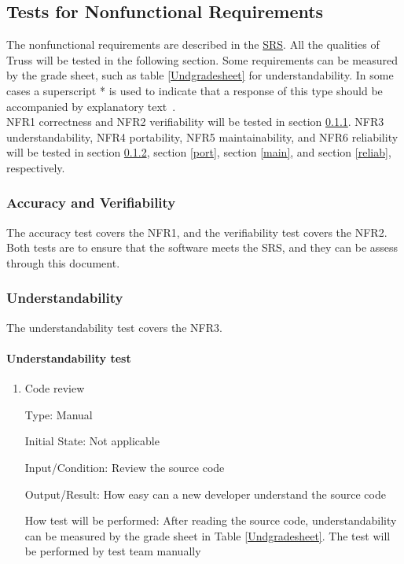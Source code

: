 \documentclass[12pt, titlepage]{article}
\begin{document}
\subsection{Tests for Nonfunctional Requirements} \label{testnfr}
The nonfunctional requirements are described in the 
\href{https://github.com/tingyuw/cas741/blob/master/docs/SRS/SRS.pdf}{SRS}. All 
the qualities of Truss will be tested in the following section. Some 
requirements can be measured by the grade sheet, such as table 
\ref{Undgradesheet} for understandability. In some cases a superscript * is 
used to indicate that a response of this type should be accompanied by 
explanatory text~\cite{Smithetal2018}.\\
NFR1 correctness and NFR2 verifiability will be tested in section \ref{candv}. 
NFR3 understandability, NFR4 portability, NFR5 maintainability, and NFR6 
reliability will be tested in section \ref{under}, section \ref{port}, section 
\ref{main}, and section \ref{reliab}, respectively.


\subsubsection{Accuracy and Verifiability} \label{candv}
The accuracy test covers the NFR1, and the verifiability test covers the
NFR2. Both tests are to ensure that the software meets the SRS, and they can 
be assess through this document.
		
\subsubsection{Understandability} \label{under}
The understandability test covers the NFR3.
\paragraph{Understandability test}

\begin{enumerate}

\item{Code review\\}

Type: Manual
					
Initial State: Not applicable
					
Input/Condition: Review the source code
					
Output/Result: How easy can a new developer understand the source code
					
How test will be performed: After reading the source code, understandability 
can be measured by the grade sheet in Table \ref{Undgradesheet}. The test will 
be performed by test team manually

\end{enumerate}
\end{document}

